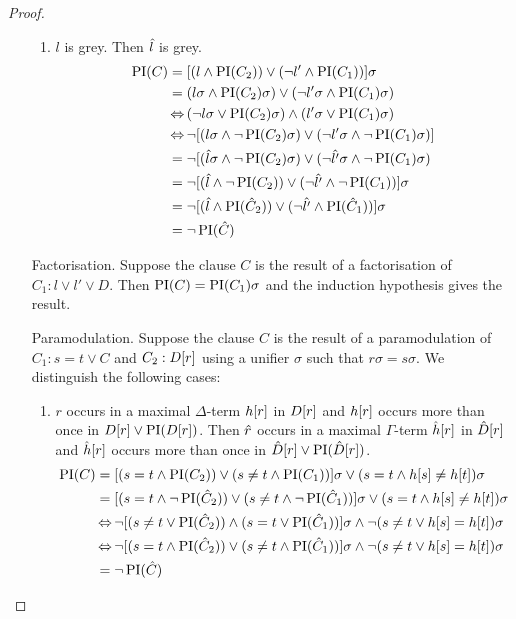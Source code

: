 \begin{proof}
\begin{itemize}
\begin{enumerate}
					\item $l$ is grey. Then $\hat{l}$ is grey.\nopagebreak 
			\begin{align*}
				\operatorname{PI}(C) 
				&=  [(l \land \operatorname{PI}(C_2)) \lor (\lnot l' \land \operatorname{PI}(C_1))] \sigma\\
				&=  (l\sigma \land \operatorname{PI}(C_2)\sigma) \lor (\lnot l' \sigma \land \operatorname{PI}(C_1)\sigma)\\
				&\operatorname{\Leftrightarrow}\,(\lnot l\sigma \lor \operatorname{PI}(C_2)\sigma) \land (l'\sigma \lor \operatorname{PI}(C_1)\sigma)\\
				&\operatorname{\Leftrightarrow} \lnot [(l\sigma \land \lnot \operatorname{PI}(C_2)\sigma) \lor (\lnot l' \sigma \land \lnot \operatorname{PI}(C_1)\sigma)]\\
				&= \lnot [(\hat{l}\sigma \land \lnot \operatorname{PI}(C_2)\sigma ) \lor (\lnot \hat{l'}\sigma \land \lnot \operatorname{PI}(C_1)\sigma)\\
				&= \lnot [(\hat{l} \land\lnot \operatorname{PI}(C_2) ) \lor (\lnot \hat{l'}\land \lnot \operatorname{PI}(C_1) )]\sigma\\
				&= \lnot  [(\hat{l} \land \operatorname{PI}(\hat{C}_2) ) \lor (\lnot \hat{l'} \land \operatorname{PI}(\hat{C}_1))]\sigma \\
				&= \lnot \operatorname{PI}(\hat{C})
			\end{align*}

			\end{enumerate}

		\item[Factorisation.]
			Suppose the clause $C$ is the result of a factorisation of $C_1: l \lor l' \lor D$. Then $\operatorname{PI}(C) = \operatorname{PI}(C_1)\sigma$ and the induction hypothesis gives the result.

		\item[Paramodulation.]
			Suppose the clause $C$ is the result of a paramodulation of $C_1: s=t \lor C$ and $C_2: D[r]$ using a unifier $\sigma$ such that $r\sigma = s\sigma$. 
			We distinguish the following cases:

			\begin{enumerate}
				\item $r$ occurs in a maximal $\Delta$-term $h[r]$ in $D[r]$ and $h[r]$ occurs more than once in $D[r] \lor \operatorname{PI}(D[r])$.
					Then $\hat{r}$ occurs in a maximal $\Gamma$-term $\hat{h}[r]$ in $\hat{D}[r]$ and $\hat{h}[r]$ occurs more than once in $\hat{D}[r] \lor \operatorname{PI}(\hat{D}[r])$.
					\begin{align*}
						\operatorname{PI}(C) &= [ ( s=t \land \operatorname{PI}(C_2) ) \lor (s\neq t \land \operatorname{PI}(C_1)) ]\sigma \lor (s=t \land h[s] \neq h[t])\sigma\\
						 &= [ ( s=t \land \lnot \operatorname{PI}(\hat{C}_2) ) \lor (s\neq t \land \lnot \operatorname{PI}(\hat{C}_1)) ]\sigma \lor (s=t \land h[s] \neq h[t])\sigma\\
						 &\operatorname{\Leftrightarrow} \lnot [ ( s\neq t \lor \operatorname{PI}(\hat{C}_2) ) \land (s= t \lor \operatorname{PI}(\hat{C}_1)) ]\sigma \land \lnot (s\neq t \lor h[s] = h[t])\sigma\\
						 &\operatorname{\Leftrightarrow} \lnot [ ( s = t \land \operatorname{PI}(\hat{C}_2) ) \lor (s\neq t \land \operatorname{PI}(\hat{C}_1)) ]\sigma \land \lnot (s\neq t \lor h[s] = h[t])\sigma\\
						 &= \lnot \operatorname{PI}(\hat{C})
					\end{align*}


\end{enumerate}
\end{itemize}
\end{proof}
